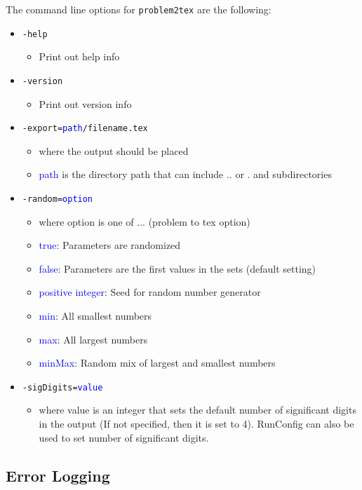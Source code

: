 \documentclass{article}
\begin{document}
The command line options for \texttt{problem2tex} are the following:
\begin{itemize}
\item \texttt{-help}
\begin{itemize}
\item[] Print out help info
\end{itemize}
\item \texttt{-version}
\begin{itemize}
\item[] Print out version info
\end{itemize}
\item \texttt{-export=\textcolor{blue}{path}/filename.tex} 
\begin{itemize}
\item[] where the output should be placed 
\item[] \textcolor{blue}{path} is the directory path that can include .. or . and subdirectories
\end{itemize}
\item \texttt{-random=\textcolor{blue}{option}}
\begin{itemize}
\item[] where option is one of ... (problem to tex option)
\item[] \textcolor{blue}{true}: Parameters are randomized
\item[] \textcolor{blue}{false}: Parameters are the first values in the sets (default setting)
\item[] \textcolor{blue}{positive integer}: Seed for random number generator
\item[] \textcolor{blue}{min}: All smallest numbers 
\item[] \textcolor{blue}{max}: All largest numbers
\item[] \textcolor{blue}{minMax}: Random mix of largest and smallest numbers

\end{itemize}
\item \texttt{-sigDigits=\textcolor{blue}{value}}
\begin{itemize}
\item[] where value is an integer that sets the default number of significant digits in the output (If not specified, then it is set to 4).  RunConfig can also be used to set number of significant digits.
\end{itemize}
\end{itemize}

\subsection{Error Logging}
\end{document}

